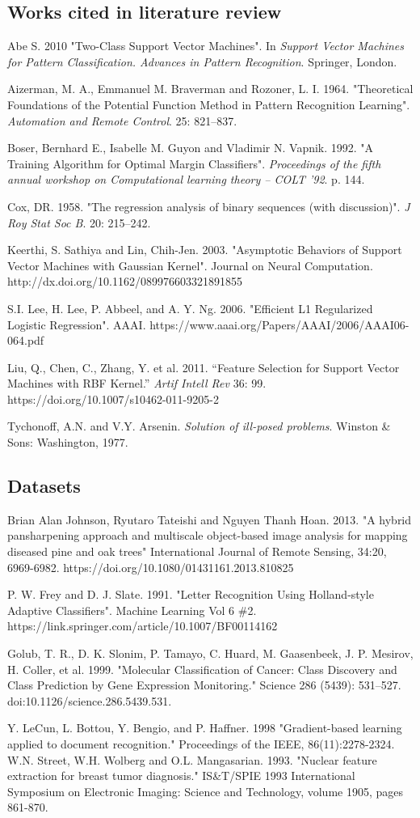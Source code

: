 \documentclass[letterpaper, 11pt]{article}
\begin{document}
\subsection{Works cited in literature review}

Abe S. 2010 "Two-Class Support Vector Machines". In \emph{Support Vector Machines for Pattern Classification. Advances in Pattern Recognition}. Springer, London.

Aizerman, M. A., Emmanuel M. Braverman and Rozoner, L. I. 1964. "Theoretical Foundations of the Potential Function Method in Pattern Recognition Learning". \emph{Automation and Remote Control}. 25: 821–837.

Boser, Bernhard E., Isabelle M. Guyon and Vladimir N. Vapnik. 1992. "A Training Algorithm for Optimal Margin Classifiers". \emph{Proceedings of the fifth annual workshop on Computational learning theory – COLT '92}. p. 144.

Cox, DR. 1958. "The regression analysis of binary sequences (with discussion)". \emph{J Roy Stat Soc B}. 20: 215–242.

Keerthi, S. Sathiya and Lin, Chih-Jen. 2003. "Asymptotic Behaviors of Support Vector Machines with Gaussian Kernel". Journal on Neural Computation. http://dx.doi.org/10.1162/089976603321891855

S.I. Lee, H. Lee, P. Abbeel, and A. Y. Ng. 2006. "Efficient L1 Regularized Logistic Regression". AAAI. https://www.aaai.org/Papers/AAAI/2006/AAAI06-064.pdf

Liu, Q., Chen, C., Zhang, Y. et al. 2011. ``Feature Selection for Support Vector Machines with RBF Kernel.'' \emph{Artif Intell Rev} 36: 99. https://doi.org/10.1007/s10462-011-9205-2

Tychonoff, A.N. and V.Y. Arsenin. \emph{Solution of ill-posed problems}. Winston \& Sons: Washington, 1977.

\subsection{Datasets}

Brian Alan Johnson, Ryutaro Tateishi and Nguyen Thanh Hoan. 2013. "A hybrid pansharpening approach and multiscale object-based image analysis for mapping diseased pine and oak trees" International Journal of Remote Sensing, 34:20, 6969-6982. https://doi.org/10.1080/01431161.2013.810825

P. W. Frey and D. J. Slate. 1991. "Letter Recognition Using Holland-style Adaptive Classifiers". Machine Learning Vol 6 \#2. https://link.springer.com/article/10.1007/BF00114162

Golub, T. R., D. K. Slonim, P. Tamayo, C. Huard, M. Gaasenbeek, J. P. Mesirov, H. Coller, et al. 1999. "Molecular Classification of Cancer: Class Discovery and Class Prediction by Gene Expression Monitoring." Science 286 (5439): 531–527. doi:10.1126/science.286.5439.531.

Y. LeCun, L. Bottou, Y. Bengio, and P. Haffner. 1998 "Gradient-based learning applied to document recognition." Proceedings of the IEEE, 86(11):2278-2324.
W.N. Street, W.H. Wolberg and O.L. Mangasarian. 1993. "Nuclear feature extraction for breast tumor diagnosis." IS\&T/SPIE 1993 International Symposium on Electronic Imaging: Science and Technology, volume 1905, pages 861-870.
\end{document}
